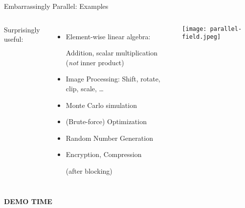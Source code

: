 \documentclass[english,compress]{beamer}
\def\bigncentered#1{
  \begin{center}
    \Huge\bfseries #1
  \end{center}
}
\begin{document}
\begin{frame}{Embarrassingly Parallel: Examples}
  \begin{columns}
      Surprisingly useful:
      \begin{itemize}
        \item Element-wise linear algebra: 

          Addition, scalar
          multiplication (\emph{not} inner product)
        \item Image Processing: Shift, rotate, clip, scale, \dots
        \item Monte Carlo simulation
        \item (Brute-force) Optimization
        \item Random Number Generation
        \item Encryption, Compression

          (after blocking)
      \end{itemize}
      \texttt{[image: parallel-field.jpeg]}
  \end{columns}
\end{frame}
\begin{frame}
  \bigncentered{DEMO TIME}
\end{frame}
\end{document}
